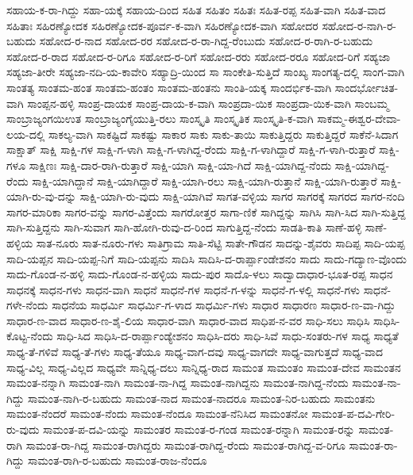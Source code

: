 ಸಹಾಯ-ಕ-ರಾ-ಗಿದ್ದು
ಸಹಾ-ಯಕ್ಕೆ
ಸಹಾಯ-ದಿಂದ
ಸಹಿತ
ಸಹಿತಂ
ಸಹಿತಃ
ಸಹಿತ-ರಪ್ಪ
ಸಹಿತ-ವಾಗಿ
ಸಹಿತ-ವಾದ
ಸಹಿತಾಃ
ಸಹಿರಣ್ಯೋದಕ
ಸಹಿರಣ್ಯೋದಕ-ಪೂರ್ವ-ಕ-ವಾಗಿ
ಸಹಿರಣ್ಯೋದಕ-ವಾಗಿ
ಸಹೋದರ
ಸಹೋದ-ರ-ನಾಗಿ-ರ-ಬಹುದು
ಸಹೋದ-ರ-ನಾದ
ಸಹೋದ-ರರ
ಸಹೋದ-ರ-ರಾ-ಗಿದ್ದ-ರೆಂಬುದು
ಸಹೋದ-ರ-ರಾಗಿ-ರ-ಬಹುದು
ಸಹೋದ-ರ-ರಾದ
ಸಹೋದ-ರ-ರಿಗೂ
ಸಹೋದ-ರ-ರಿಗೆ
ಸಹೋದ-ರರು
ಸಹೋದ-ರರೂ
ಸಹೋದ-ರಿಗೆ
ಸಹ್ಯಜಾ
ಸಹ್ಯಜಾ-ತೀರೇ
ಸಹ್ಯಜಾ-ನದಿ-ಯ-ಕಾವೇರಿ
ಸಹ್ಯಾದ್ರಿ-ಯಿಂದ
ಸಾ
ಸಾಂಕೇತಿ-ಸುತ್ತಿದೆ
ಸಾಂಖ್ಯ
ಸಾಂಗತ್ಯ-ದಲ್ಲಿ
ಸಾಂಗ-ವಾಗಿ
ಸಾಂತತ್ಯ
ಸಾಂತಮ-ಹಂತ
ಸಾಂತಮ-ಹಂತಂ
ಸಾಂತಮ-ಹಂತನು
ಸಾಂತಿ-ಯಕ್ಕ
ಸಾಂದರ್ಭಿಕ-ವಾಗಿ
ಸಾಂದರ್ಭೋಚಿತ-ವಾಗಿ
ಸಾಂಪ್ಪನ-ಹಳ್ಳಿ
ಸಾಂಪ್ರ-ದಾಯಕ
ಸಾಂಪ್ರ-ದಾಯ-ಕ-ವಾಗಿ
ಸಾಂಪ್ರದಾ-ಯಿಕ
ಸಾಂಪ್ರದಾ-ಯಿಕ-ವಾಗಿ
ಸಾಂಬಮ್ಮ
ಸಾಂಬ್ರಾಜ್ಯಂಗಯಿಉತ
ಸಾಂಬ್ರಾಜ್ಯಂಗೈಯುತ್ತಿ-ರಲು
ಸಾಂಸ್ಕೃತಿ
ಸಾಂಸ್ಕೃತಿಕ
ಸಾಂಸ್ಕೃತಿ-ಕ-ವಾಗಿ
ಸಾಕಮ್ಮ-ಈಶ್ವರ-ದೇವಾ-ಲಯ-ದಲ್ಲಿ
ಸಾಕಲ್ಯ-ವಾಗಿ
ಸಾಕಷ್ಟಿದೆ
ಸಾಕಷ್ಟು
ಸಾಕಾರ
ಸಾಕು
ಸಾಕು-ತಾಯಿ
ಸಾಕುತ್ತಿದ್ದರು
ಸಾಕುತ್ತಿದ್ದರೆ
ಸಾಕೆನೆ-ಸಿದಾಗ
ಸಾಕ್ಷಾತ್
ಸಾಕ್ಷಿ
ಸಾಕ್ಷಿ-ಗಳ
ಸಾಕ್ಷಿ-ಗ-ಳಾಗಿ
ಸಾಕ್ಷಿ-ಗ-ಳಾಗಿದ್ದ-ರೆಂದು
ಸಾಕ್ಷಿ-ಗ-ಳಾಗಿದ್ದಾರೆ
ಸಾಕ್ಷಿ-ಗ-ಳಾಗಿ-ರುತ್ತಾರೆ
ಸಾಕ್ಷಿ-ಗಳೂ
ಸಾಕ್ಷಿಣಃ
ಸಾಕ್ಷಿ-ದಾರ-ರಾಗಿ-ರುತ್ತಾರೆ
ಸಾಕ್ಷಿ-ಯಾಗಿ
ಸಾಕ್ಷಿ-ಯಾ-ಗಿದೆ
ಸಾಕ್ಷಿ-ಯಾಗಿದ್ದ-ನೆಂದು
ಸಾಕ್ಷಿ-ಯಾಗಿದ್ದ-ರೆಂದು
ಸಾಕ್ಷಿ-ಯಾಗಿದ್ದಾನೆ
ಸಾಕ್ಷಿ-ಯಾಗಿದ್ದಾರೆ
ಸಾಕ್ಷಿ-ಯಾಗಿ-ರಲು
ಸಾಕ್ಷಿ-ಯಾಗಿ-ರುತ್ತಾನೆ
ಸಾಕ್ಷಿ-ಯಾಗಿ-ರುತ್ತಾರೆ
ಸಾಕ್ಷಿ-ಯಾಗಿ-ರು-ವು-ದನ್ನು
ಸಾಕ್ಷಿ-ಯಾಗಿ-ರು-ವುದು
ಸಾಕ್ಷಿ-ಯಾಗಿವೆ
ಸಾಗತ-ವಳ್ಳಿಯ
ಸಾಗರ
ಸಾಗರಕ್ಕೆ
ಸಾಗರದ
ಸಾಗರ-ನಂದಿ
ಸಾಗರ-ಮಾರಿಕಾ
ಸಾಗರ-ವನ್ನು
ಸಾಗರ-ವಿತ್ತೆಂದು
ಸಾಗರೋತ್ತರ
ಸಾಗಾ-ಣಿಕೆ
ಸಾಗಿದ್ದನ್ನು
ಸಾಗಿಸಿ
ಸಾಗಿ-ಸಿದ
ಸಾಗಿ-ಸುತ್ತಿದ್ದ
ಸಾಗಿ-ಸುತ್ತಿದ್ದನು
ಸಾಗಿ-ಸುವಾಗ
ಸಾಗಿ-ಹೋಗಿ-ರುವು-ದ-ರಿಂದ
ಸಾಗುತ್ತಿದ್ದ-ನೆಂದು
ಸಾಡತಿ-ಕಾತಿ
ಸಾಣೆ-ಹಳ್ಳಿ
ಸಾಣೆ-ಹಳ್ಳಿಯ
ಸಾತ-ನೂರು
ಸಾತ-ನೂರು-ಗಳು
ಸಾತಿಗ್ರಾಮ
ಸಾತಿ-ಸೆಟ್ಟಿ
ಸಾತೇ-ಗೌಡನ
ಸಾದನ್ನು-ಶೈವರು
ಸಾದಿಪ್ಪ
ಸಾದಿ-ಯಪ್ಪ
ಸಾದಿ-ಯಪ್ಪನ
ಸಾದಿ-ಯಪ್ಪ-ನಿಗೆ
ಸಾದಿ-ಯಪ್ಪನು
ಸಾದಿಸಿ
ಸಾದಿಸಿ-ದ-ರಾರ್ಪ್ಪಾಂಡೇಶನಂ
ಸಾದು
ಸಾದು-ಗದ್ಯಾಣ-ವೊಂದು
ಸಾದು-ಗೊಂಡ-ನ-ಹಳ್ಳಿ
ಸಾದು-ಗೊಂಡ-ನ-ಹಳ್ಳಿಯ
ಸಾದು-ಪುರ
ಸಾದೊ-ಳಲು
ಸಾದ್ವಾದಾಧಾರ-ಭೂತ-ರಪ್ಪ
ಸಾಧನ
ಸಾಧನಕ್ಕೆ
ಸಾಧನ-ಗಳು
ಸಾಧನ-ವಾಗಿ
ಸಾಧನೆ
ಸಾಧನೆ-ಗಳ
ಸಾಧನೆ-ಗ-ಳನ್ನು
ಸಾಧನೆ-ಗ-ಳಲ್ಲಿ
ಸಾಧನೆ-ಗಳು
ಸಾಧನೆ-ಗಳೇ-ನೆಂದು
ಸಾಧನೆಯ
ಸಾಧರ್ಮಿ
ಸಾಧರ್ಮಿ-ಗ-ಳಾದ
ಸಾಧರ್ಮಿ-ಗಳು
ಸಾಧಾರ
ಸಾಧಾರಣ
ಸಾಧಾರ-ಣ-ವಾ-ಗಿದ್ದು
ಸಾಧಾರ-ಣ-ವಾದ
ಸಾಧಾರ-ಣ-ಶೈ-ಲಿಯ
ಸಾಧಾರ-ವಾಗಿ
ಸಾಧಾರ-ವಾದ
ಸಾಧಿಪ-ನ-ವರ
ಸಾಧಿ-ಸಲು
ಸಾಧಿಸಿ
ಸಾಧಿಸಿ-ಕೊಟ್ಟ-ನೆಂದು
ಸಾಧಿ-ಸಿದ
ಸಾಧಿಸಿ-ದ-ರಾರ್ಪ್ಪಾಂಡ್ಯೇಶನಂ
ಸಾಧಿಸಿ-ದರು
ಸಾಧಿ-ಸಿವೆ
ಸಾಧು-ಸಂತರು-ಗಳ
ಸಾಧ್ಯ
ಸಾಧ್ಯತೆ
ಸಾಧ್ಯ-ತೆ-ಗಳಿವೆ
ಸಾಧ್ಯ-ತೆ-ಗಳು
ಸಾಧ್ಯ-ತೆಯೂ
ಸಾಧ್ಯ-ವಾಗ-ದವು
ಸಾಧ್ಯ-ವಾಗದೇ
ಸಾಧ್ಯ-ವಾಗುತ್ತದೆ
ಸಾಧ್ಯ-ವಾದ
ಸಾಧ್ಯ-ವಿಲ್ಲ
ಸಾಧ್ಯ-ವಿಲ್ಲದ
ಸಾಧ್ಯವೇ
ಸಾನ್ನಿಧ್ಯ-ದಲು
ಸಾನ್ನಿಧ್ಯ-ರಾದ
ಸಾಮಂತ
ಸಾಮಂತಂ
ಸಾಮಂತ-ದೇವ
ಸಾಮಂತನ
ಸಾಮಂತ-ನನ್ನಾಗಿ
ಸಾಮಂತ-ನಾಗಿ
ಸಾಮಂತ-ನಾ-ಗಿದ್ದ
ಸಾಮಂತ-ನಾಗಿದ್ದನು
ಸಾಮಂತ-ನಾಗಿದ್ದ-ನೆಂದು
ಸಾಮಂತ-ನಾ-ಗಿದ್ದು
ಸಾಮಂತ-ನಾಗಿ-ರ-ಬಹುದು
ಸಾಮಂತ-ನಾದ
ಸಾಮಂತ-ನಾದರೂ
ಸಾಮಂತ-ನಿರ-ಬಹುದು
ಸಾಮಂತನು
ಸಾಮಂತ-ನೆಂದರೆ
ಸಾಮಂತ-ನೆಂದು
ಸಾಮಂತ-ನೆಂದೂ
ಸಾಮಂತ-ನೆನಿಸಿದ
ಸಾಮಂತನೋ
ಸಾಮಂತ-ಪ-ದವಿ-ಗೇರಿ-ರು-ವುದು
ಸಾಮಂತ-ಪ-ದವಿ-ಯನ್ನು
ಸಾಮಂತರ
ಸಾಮಂತ-ರ-ಗಂಡ
ಸಾಮಂತ-ರನ್ನಾಗಿ
ಸಾಮಂತ-ರನ್ನು
ಸಾಮಂತ-ರಾಗಿ
ಸಾಮಂತ-ರಾ-ಗಿದ್ದ
ಸಾಮಂತ-ರಾಗಿದ್ದರು
ಸಾಮಂತ-ರಾಗಿದ್ದ-ರೆಂದು
ಸಾಮಂತ-ರಾಗಿದ್ದ-ವ-ರಿಗೂ
ಸಾಮಂತ-ರಾ-ಗಿದ್ದು
ಸಾಮಂತ-ರಾಗಿ-ರ-ಬಹುದು
ಸಾಮಂತ-ರಾಜ-ನೆಂದೂ
